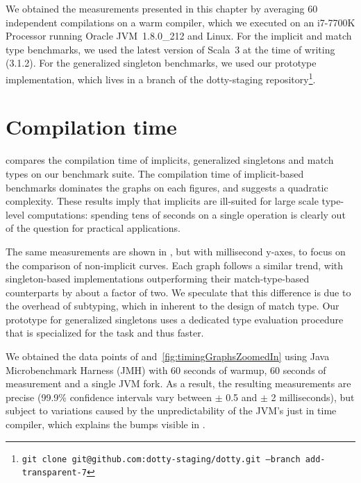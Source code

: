 We obtained the measurements presented in this chapter by averaging 60 independent compilations on a warm compiler, which we executed on an i7-7700K Processor running Oracle JVM~1.8.0\_212 and Linux.
For the implicit and match type benchmarks, we used the latest version of Scala~3 at the time of writing (3.1.2).
For the generalized singleton benchmarks, we used our prototype implementation, which lives in a branch of the dotty-staging repository\footnote{\texttt{git clone git@github.com:dotty-staging/dotty.git --branch add-transparent-7}}.

\section{Compilation time}
\label{sec:compilation-time}


 compares the compilation time of implicits, generalized singletons and match types on our benchmark suite.
The compilation time of implicit-based benchmarks dominates the graphs on each figures, and suggests a quadratic complexity.
These results imply that implicits are ill-suited for large scale type-level computations: spending tens of seconds on a single operation is clearly out of the question for practical applications.


The same measurements are shown in , but with millisecond y-axes, to focus on the comparison of non-implicit curves.
Each graph follows a similar trend, with singleton-based implementations outperforming their match-type-based counterparts by about a factor of two.
We speculate that this difference is due to the overhead of subtyping, which in inherent to the design of match type.
Our prototype for generalized singletons uses a dedicated type evaluation procedure that is specialized for the task and thus faster.

We obtained the data points of  and~\ref{fig:timingGraphsZoomedIn} using Java Microbenchmark Harness (JMH) with 60 seconds of warmup, 60 seconds of measurement and a single JVM fork.
As a result, the resulting measurements are precise (99.9\% confidence intervals vary between $\pm$ 0.5 and $\pm$ 2 milliseconds), but subject to variations caused by the unpredictability of the JVM's just in time compiler, which explains the bumps visible in .

